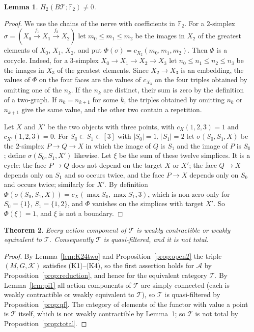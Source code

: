 \documentclass[11pt,a4paper]{article}
\newtheorem{theorem}{Theorem}[section]
\newtheorem{lemma}[theorem]{Lemma}
\theoremstyle{definition}
\newcommand{\K}{\mathcal{K}}
\newcommand{\F}{\mathbb{F}}
\begin{document}
\begin{lemma}\label{lem:H2}
$H_2(B\mathcal T;\F_2)\ne 0$.
\end{lemma}

\begin{proof}
We use the chains of the nerve with coefficients in $\F_2$. For a
$2$-simplex $\sigma=(X_0\xrightarrow{f_1}X_1\xrightarrow{f_2}X_2)$ let
$m_0\le m_1\le m_2$ be the images in $X_2$ of the greatest elements of $X_0$,
$X_1$, $X_2$, and put $\Phi(\sigma)=c_{X_2}(m_0,m_1,m_2)$. Then $\Phi$ is a
cocycle. Indeed, for a $3$-simplex $X_0\to X_1\to X_2\to X_3$ let
$n_0\le n_1\le n_2\le n_3$ be the images in $X_3$ of the greatest elements.
Since $X_2\to X_3$ is an embedding, the values of $\Phi$ on the four faces are
the values of $c_{X_3}$ on the four triples obtained by omitting one of the
$n_k$. If the $n_k$ are distinct, their sum is zero by the definition of a
two-graph. If $n_k=n_{k+1}$ for some $k$, the triples obtained by omitting
$n_k$ or $n_{k+1}$ give the same value, and the other two contain a
repetition.

Let $X$ and $X'$ be the two objects with three points, with
$c_X(1,2,3)=1$ and $c_{X'}(1,2,3)=0$. For $S_0\subset S_1\subset[3]$ with
$|S_0|=1$, $|S_1|=2$ let $\sigma(S_0,S_1,X)$ be the $2$-simplex
$P\to Q\to X$ in which the image of $Q$ is $S_1$ and the image of $P$ is
$S_0$; define $\sigma(S_0,S_1,X')$ likewise. Let $\xi$ be the sum of these
twelve simplices. It is a cycle: the face $P\to Q$ does not depend on the
target $X$ or $X'$; the face $Q\to X$ depends only on $S_1$ and so occurs
twice, and the face $P\to X$ depends only on $S_0$ and occurs twice; similarly
for $X'$. By definition $\Phi(\sigma(S_0,S_1,X))=c_X(\max S_0,\max S_1,3)$,
which is non-zero only for $S_0=\{1\}$, $S_1=\{1,2\}$, and $\Phi$ vanishes on
the simplices with target $X'$. So $\Phi(\xi)=1$, and $\xi$ is not a boundary.
\end{proof}

\begin{theorem}\label{thm:twographs}
Every action component of $\mathcal T$ is weakly contractible or weakly
equivalent to $\mathcal T$. Consequently $\mathcal T$ is quasi-filtered, and
it is not total.
\end{theorem}

\begin{proof}
By Lemma~\ref{lem:K24two} and Proposition~\ref{prop:open2} the triple
$(M,G,\K)$ satisfies (K1)--(K4), so the first assertion holds for $\mathcal A$
by Proposition~\ref{prop:reduction}, and hence for the equivalent category
$\mathcal T$. By Lemma~\ref{lem:pi1} all action components of $\mathcal T$ are
simply connected (each is weakly contractible or weakly equivalent to
$\mathcal T$), so $\mathcal T$ is quasi-filtered by
Proposition~\ref{prop:qf}. The category of elements of the functor with value
a point is $\mathcal T$ itself, which is not weakly contractible by
Lemma~\ref{lem:H2}; so $\mathcal T$ is not total by
Proposition~\ref{prop:total}.
\end{proof}
\end{document}

